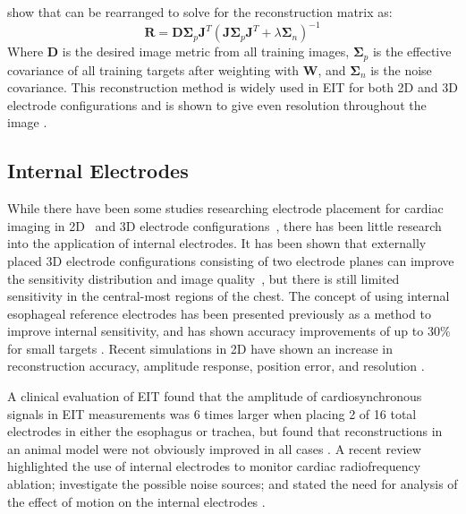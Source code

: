  show that  can 
be rearranged to solve for the reconstruction matrix
as:
\begin{equation} 
	\mathbf{R} = \mathbf{D}  
	\mathbf{\Sigma}_p \mathbf{J}^T(\mathbf{J}  
	 \mathbf{\Sigma}_p  \mathbf{J}^T + 
	 \lambda \mathbf{\Sigma}_n)^{-1}
\end{equation}
Where $\mathbf{D}$ is the desired image metric from all training images,
$\mathbf{\Sigma}_p$  is the effective covariance of all training targets after weighting with 
$\mathbf{W}$, and 
$\mathbf{\Sigma}_n$ is the noise covariance. 
This reconstruction method is widely used in EIT for both 2D and 3D electrode configurations 
and is shown to give even resolution throughout the image \parencite{adler_greit_2009}.

\subsection{Internal Electrodes}

While there have been some studies researching electrode placement for cardiac
imaging in 2D~\parencite{vonk_noordegraaf_improvement_1996} and 
3D electrode configurations~\parencite{graham_electrode_2007}, there has 
been little research into the application of internal electrodes. 
It has been shown that externally placed 3D electrode configurations
consisting of two electrode planes
can improve the sensitivity distribution and image quality~\parencite{grychtol_3d_2016},
but there is still limited sensitivity in the central-most regions 
of the chest.
The concept of using internal esophageal reference electrodes has been presented
previously
\parencite{pilkington_utilization_1989,schuessler_utility_1995}
as a method to improve internal sensitivity, and has shown
accuracy improvements of up to 30\% for small 
targets \parencite{pilkington_utilization_1989}.
Recent simulations in 2D have shown an increase in reconstruction 
accuracy, amplitude response, position error, and resolution
\parencite{nasehi_tehrani_modelling_2012,nasehi_tehrani_evaluation_2012}.

A clinical evaluation of EIT found that the amplitude of cardiosynchronous signals 
in EIT measurements was 6 times larger when placing 2 of 16 total electrodes in 
either the esophagus or trachea, but found that reconstructions 
in an animal model were not obviously improved in all cases \parencite{czaplik_application_2014}.
A recent review highlighted the use of internal electrodes to monitor cardiac radiofrequency
ablation; investigate the possible noise sources; and 
stated the need for analysis of the effect of motion on the 
internal electrodes
\parencite{nguyen_electrical_2020}.

